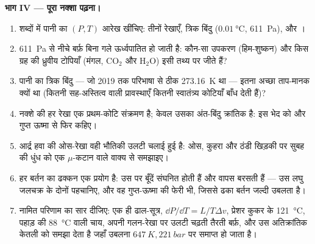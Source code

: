 \begin{problem}
\medskip\noindent\textbf{भाग IV --- पूरा नक्शा पढ़ना।}
\begin{enumerate}[resume]
  \item शब्दों में पानी का $(P, T)$ आरेख खींचिए: तीनों
        रेखाएँ, त्रिक बिंदु ($\qty{0.01}{\celsius}$,
        \qty{611}{Pa}), और ।
  \item \qty{611}{Pa} से नीचे बर्फ़ बिना गले ऊर्ध्वपातित हो जाती
        है: कौन-सा उपकरण (हिम-शुष्कन) और किस ग्रह की ध्रुवीय
        टोपियाँ (मंगल, CO$_2$ और H$_2$O) इसी तथ्य पर जीते हैं?
  \item पानी का त्रिक बिंदु --- जो 2019 तक परिभाषा से ठीक
        \qty{273.16}{K} था --- इतना अच्छा ताप-मानक क्यों था
        (कितनी सह-अस्तित्व वाली प्रावस्थाएँ कितनी
        स्वातंत्र्य कोटियाँ बाँध देती हैं)?
  \item नक्शे की हर रेखा एक प्रथम-कोटि संक्रमण है; केवल उसका
        अंत-बिंदु क्रांतिक है: इस भेद को
         और गुप्त ऊष्मा से फिर कहिए।
  \item आर्द्र हवा की ओस-रेखा वही भौतिकी उलटी चलाई हुई है: ओस,
        कुहरा और ठंडी खिड़की पर सुबह की धुंध को एक $\mu$-कटान वाले
        वाक्य से समझाइए।
  \item हर बर्तन का ढक्कन एक प्रयोग है: उस पर बूँदें संघनित होती
        हैं और वापस बरसती हैं --- उस लघु जलचक्र के दोनों
         पहचानिए, और वह गुप्त-ऊष्मा की फेरी भी,
        जिससे ढका बर्तन जल्दी उबलता है।
  \item नामित परिणाम का सार दीजिए: एक ही ढाल-सूत्र, $\dd P/
        \dd T = L/T\Delta v$, प्रेशर कुकर के
        \qty{121}{\celsius}, पहाड़ की \qty{88}{\celsius} वाली
        चाय, अपनी गलन-रेखा पर उलटी चढ़ती तैरती बर्फ़, और उस
        अतिक्रांतिक केतली को समझा देता है जहाँ उबलना
        $\qty{647}{K}, \qty{221}{bar}$ पर समाप्त हो जाता है।
\end{enumerate}
\end{problem}
